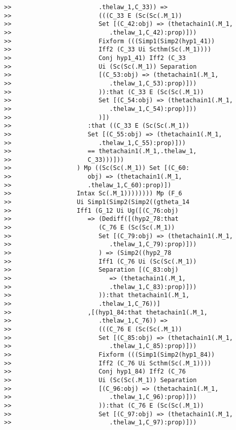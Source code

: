 \documentclass[12pt]{article}
\begin{document}
\begin{verbatim}
>>                        .thelaw_1,C_33)) =>
>>                        (((C_33 E (Sc(Sc(.M_1))
>>                        Set [(C_42:obj) => (thetachain1(.M_1,
>>                           .thelaw_1,C_42):prop)]))
>>                        Fixform (((Simp1(Simp2(hyp1_41))
>>                        Iff2 (C_33 Ui Scthm(Sc(.M_1))))
>>                        Conj hyp1_41) Iff2 (C_33
>>                        Ui (Sc(Sc(.M_1)) Separation
>>                        [(C_53:obj) => (thetachain1(.M_1,
>>                           .thelaw_1,C_53):prop)]))
>>                        )):that (C_33 E (Sc(Sc(.M_1))
>>                        Set [(C_54:obj) => (thetachain1(.M_1,
>>                           .thelaw_1,C_54):prop)]))
>>                        )])
>>                     :that ((C_33 E (Sc(Sc(.M_1))
>>                     Set [(C_55:obj) => (thetachain1(.M_1,
>>                        .thelaw_1,C_55):prop)]))
>>                     == thetachain1(.M_1,.thelaw_1,
>>                     C_33)))]))
>>                  ) Mp ((Sc(Sc(.M_1)) Set [(C_60:
>>                     obj) => (thetachain1(.M_1,
>>                     .thelaw_1,C_60):prop)])
>>                  Intax Sc(.M_1)))))))) Mp (F_6
>>                  Ui Simp1(Simp2(Simp2((gtheta_14
>>                  Iff1 (G_12 Ui Ug([(C_76:obj)
>>                     => (Dediff([(hyp2_78:that
>>                        (C_76 E (Sc(Sc(.M_1))
>>                        Set [(C_79:obj) => (thetachain1(.M_1,
>>                           .thelaw_1,C_79):prop)]))
>>                        ) => (Simp2((hyp2_78
>>                        Iff1 (C_76 Ui (Sc(Sc(.M_1))
>>                        Separation [(C_83:obj)
>>                           => (thetachain1(.M_1,
>>                           .thelaw_1,C_83):prop)]))
>>                        )):that thetachain1(.M_1,
>>                        .thelaw_1,C_76))]
>>                     ,[(hyp1_84:that thetachain1(.M_1,
>>                        .thelaw_1,C_76)) =>
>>                        (((C_76 E (Sc(Sc(.M_1))
>>                        Set [(C_85:obj) => (thetachain1(.M_1,
>>                           .thelaw_1,C_85):prop)]))
>>                        Fixform (((Simp1(Simp2(hyp1_84))
>>                        Iff2 (C_76 Ui Scthm(Sc(.M_1))))
>>                        Conj hyp1_84) Iff2 (C_76
>>                        Ui (Sc(Sc(.M_1)) Separation
>>                        [(C_96:obj) => (thetachain1(.M_1,
>>                           .thelaw_1,C_96):prop)]))
>>                        )):that (C_76 E (Sc(Sc(.M_1))
>>                        Set [(C_97:obj) => (thetachain1(.M_1,
>>                           .thelaw_1,C_97):prop)]))

\end{verbatim}
\end{document}
